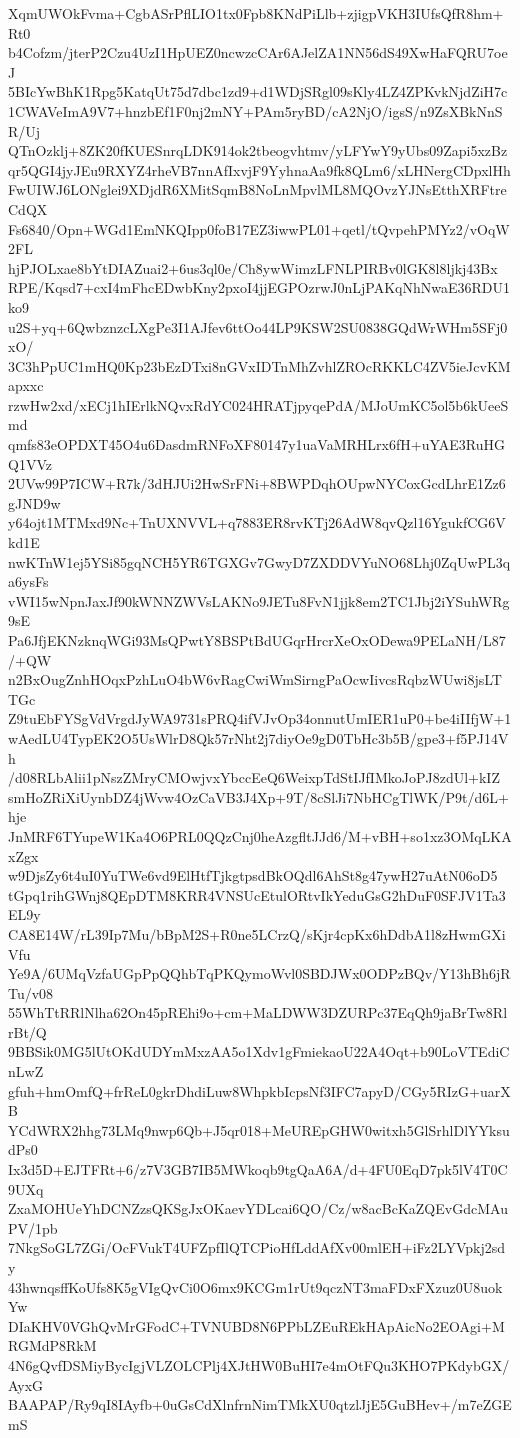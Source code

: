 XqmUWOkFvma+CgbASrPflLIO1tx0Fpb8KNdPiLlb+zjigpVKH3IUfsQfR8hm+Rt0
b4Cofzm/jterP2Czu4UzI1HpUEZ0ncwzcCAr6AJelZA1NN56dS49XwHaFQRU7oeJ
5BIcYwBhK1Rpg5KatqUt75d7dbc1zd9+d1WDjSRgl09sKly4LZ4ZPKvkNjdZiH7c
1CWAVeImA9V7+hnzbEf1F0nj2mNY+PAm5ryBD/cA2NjO/igsS/n9ZsXBkNnSR/Uj
QTnOzklj+8ZK20fKUESnrqLDK914ok2tbeogvhtmv/yLFYwY9yUbs09Zapi5xzBz
qr5QGI4jyJEu9RXYZ4rheVB7nnAfIxvjF9YyhnaAa9fk8QLm6/xLHNergCDpxlHh
FwUIWJ6LONglei9XDjdR6XMitSqmB8NoLnMpvlML8MQOvzYJNsEtthXRFtreCdQX
Fs6840/Opn+WGd1EmNKQIpp0foB17EZ3iwwPL01+qetl/tQvpehPMYz2/vOqW2FL
hjPJOLxae8bYtDIAZuai2+6us3ql0e/Ch8ywWimzLFNLPIRBv0lGK8l8ljkj43Bx
RPE/Kqsd7+cxI4mFhcEDwbKny2pxoI4jjEGPOzrwJ0nLjPAKqNhNwaE36RDU1ko9
u2S+yq+6QwbznzcLXgPe3I1AJfev6ttOo44LP9KSW2SU0838GQdWrWHm5SFj0xO/
3C3hPpUC1mHQ0Kp23bEzDTxi8nGVxIDTnMhZvhlZROcRKKLC4ZV5ieJcvKMapxxc
rzwHw2xd/xECj1hIErlkNQvxRdYC024HRATjpyqePdA/MJoUmKC5ol5b6kUeeSmd
qmfs83eOPDXT45O4u6DasdmRNFoXF80147y1uaVaMRHLrx6fH+uYAE3RuHGQ1VVz
2UVw99P7ICW+R7k/3dHJUi2HwSrFNi+8BWPDqhOUpwNYCoxGcdLhrE1Zz6gJND9w
y64ojt1MTMxd9Nc+TnUXNVVL+q7883ER8rvKTj26AdW8qvQzl16YgukfCG6Vkd1E
nwKTnW1ej5YSi85gqNCH5YR6TGXGv7GwyD7ZXDDVYuNO68Lhj0ZqUwPL3qa6ysFs
vWI15wNpnJaxJf90kWNNZWVsLAKNo9JETu8FvN1jjk8em2TC1Jbj2iYSuhWRg9sE
Pa6JfjEKNzknqWGi93MsQPwtY8BSPtBdUGqrHrcrXeOxODewa9PELaNH/L87/+QW
n2BxOugZnhHOqxPzhLuO4bW6vRagCwiWmSirngPaOcwIivcsRqbzWUwi8jsLTTGc
Z9tuEbFYSgVdVrgdJyWA9731sPRQ4ifVJvOp34onnutUmIER1uP0+be4iIIfjW+1
wAedLU4TypEK2O5UsWlrD8Qk57rNht2j7diyOe9gD0TbHc3b5B/gpe3+f5PJ14Vh
/d08RLbAlii1pNszZMryCMOwjvxYbccEeQ6WeixpTdStIJfIMkoJoPJ8zdUl+kIZ
smHoZRiXiUynbDZ4jWvw4OzCaVB3J4Xp+9T/8cSlJi7NbHCgTlWK/P9t/d6L+hje
JnMRF6TYupeW1Ka4O6PRL0QQzCnj0heAzgfltJJd6/M+vBH+so1xz3OMqLKAxZgx
w9DjsZy6t4uI0YuTWe6vd9ElHtfTjkgtpsdBkOQdl6AhSt8g47ywH27uAtN06oD5
tGpq1rihGWnj8QEpDTM8KRR4VNSUcEtulORtvIkYeduGsG2hDuF0SFJV1Ta3EL9y
CA8E14W/rL39Ip7Mu/bBpM2S+R0ne5LCrzQ/sKjr4cpKx6hDdbA1l8zHwmGXiVfu
Ye9A/6UMqVzfaUGpPpQQhbTqPKQymoWvl0SBDJWx0ODPzBQv/Y13hBh6jRTu/v08
55WhTtRRlNlha62On45pREhi9o+cm+MaLDWW3DZURPc37EqQh9jaBrTw8RlrBt/Q
9BBSik0MG5lUtOKdUDYmMxzAA5o1Xdv1gFmiekaoU22A4Oqt+b90LoVTEdiCnLwZ
gfuh+hmOmfQ+frReL0gkrDhdiLuw8WhpkbIcpsNf3IFC7apyD/CGy5RIzG+uarXB
YCdWRX2hhg73LMq9nwp6Qb+J5qr018+MeUREpGHW0witxh5GlSrhlDlYYksudPs0
Ix3d5D+EJTFRt+6/z7V3GB7IB5MWkoqb9tgQaA6A/d+4FU0EqD7pk5lV4T0C9UXq
ZxaMOHUeYhDCNZzsQKSgJxOKaevYDLcai6QO/Cz/w8acBcKaZQEvGdcMAuPV/1pb
7NkgSoGL7ZGi/OcFVukT4UFZpfIlQTCPioHfLddAfXv00mlEH+iFz2LYVpkj2sdy
43hwnqsffKoUfs8K5gVIgQvCi0O6mx9KCGm1rUt9qczNT3maFDxFXzuz0U8uokYw
DIaKHV0VGhQvMrGFodC+TVNUBD8N6PPbLZEuREkHApAicNo2EOAgi+MRGMdP8RkM
4N6gQvfDSMiyBycIgjVLZOLCPlj4XJtHW0BuHI7e4mOtFQu3KHO7PKdybGX/AyxG
BAAPAP/Ry9qI8IAyfb+0uGsCdXlnfrnNimTMkXU0qtzlJjE5GuBHev+/m7eZGEmS
